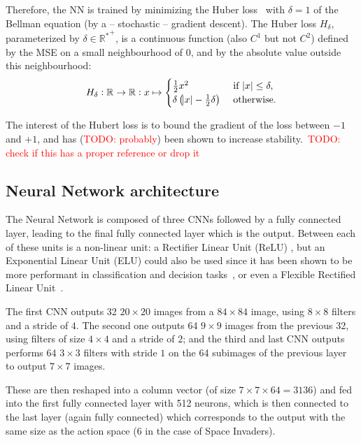 \documentclass[letterpaper]{article}
\newcommand\todo[1]{\textcolor{red}{TODO: #1}}
\begin{document}
Therefore, the NN is trained by minimizing the Huber loss~\citep{huber1964robust} with $\delta=1$ of the Bellman equation (by a -- stochastic -- gradient descent).
The Huber loss $H_\delta$, parameterized by $\delta \in {\mathbb R^*}^+$, is a continuous function (also $C^1$ but not $C^2$) defined by the MSE
on a small neighbourhood of $0$, and by the absolute value outside this neighbourhood:
\begin{equation}
	H_\delta : \mathbb R \to \mathbb R : x \mapsto \begin{cases}\frac 12x^2                                &\text{ if } \abs x \leq \delta,\\
	                                                            \delta\left(\abs x - \frac 12\delta\right) &\text{ otherwise.}\end{cases}
\end{equation}

The interest of the Hubert loss is to bound the gradient of the loss between $-1$ and $+1$, and has (\todo {probably}) been shown to increase
stability.~\todo{check if this has a proper reference or drop it}

\subsection{Neural Network architecture}

The Neural Network is composed of three CNNs followed by a fully connected layer, leading to the final fully connected layer which is the output.
Between each of these units is a non-linear unit: a Rectifier Linear Unit (ReLU) \citep{krizhevsky2012imagenet}, but an Exponential Linear Unit (ELU) could
also be used since it has been shown to be more performant in classification and decision tasks~\citep{DBLP:journals/corr/ClevertUH15}, or even a
Flexible Rectified Linear Unit~\citep{qiu2017flexible}.

The first CNN outputs 32 $20 \times 20$ images from a $84 \times 84$ image, using $8 \times 8$ filters and a stride of $4$. The second one outputs
64 $9 \times 9$ images from the previous 32, using filters of size $4 \times 4$ and a stride of $2$; and the third and last CNN outputs performs
64 $3 \times 3$ filters with stride $1$ on the 64 subimages of the previous layer to output $7 \times 7$ images.

These are then reshaped into a column vector (of size $7 \times 7 \times 64 = 3136$) and fed into the first fully connected layer with 512 neurons,
which is then connected to the last layer (again fully connected) which corresponds to the output with the same size as the action space (6 in the
case of Space Invaders).
\end{document}
